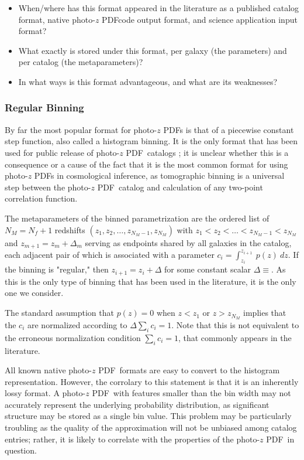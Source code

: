 \documentclass[\docopts]{\docclass}
\newcommand{\pz}{photo-$z$ PDF}
\begin{document}
\begin{itemize}
  \item When/where has this format appeared in the literature as a published 
catalog format, native \pz code output format, and science application input 
format?
  \item What exactly is stored under this format, per galaxy (the parameters) 
and per catalog (the metaparameters)?
  \item In what ways is this format advantageous, and what are its weaknesses?
\end{itemize}

\subsubsection{Regular Binning}
\label{sec:bins}

By far the most popular format for \pz s is that of a piecewise constant step 
function, also called a histogram binning.  It is the only format that has been 
used for public release of \pz\ catalogs \citep{tanaka_photometric_2017, 
sheldon_photometric_2012}; it is unclear whether this is a consequence or a 
cause of the fact that it is the most common format for using \pz s in 
cosmological inference, as tomographic binning is a universal step between the 
\pz\ catalog and calculation of any two-point correlation function.

The metaparameters of the binned parametrization are the ordered list of 
$N_{M}=N_{f}+1$ redshifts $(z_{1}, z_{2}, \dots, z_{N_{M}-1}, z_{N_{M}})$ with 
$z_{1} < z_{2} < \dots < z_{N_{M}-1} < z_{N_{M}}$ and 
$z_{m+1}=z_{m}+\Delta_{m}$ serving as endpoints shared by all galaxies in the 
catalog, each adjacent pair of which is associated with a parameter 
$c_{i}=\int_{z_{i}}^{z_{i+1}}\ p(z)\ dz$.  If the binning is "regular," then 
$z_{i+1}=z_{i}+\Delta$ for some constant scalar $\Delta\equiv$.  As this is the 
only type of binning that has been used in the literature, it is the only one 
we consider.

The standard assumption that $p(z)=0$ when $z<z_{1}$ or $z>z_{N_{M}}$ implies 
that the $c_{i}$ are normalized according to $\Delta \sum_{i} c_{i} = 1$.  Note 
that this is not equivalent to the erroneous normalization condition $\sum_{i} 
c_{i} = 1$, that commonly appears in the literature.

All known native \pz\ formats are easy to convert to the histogram 
representation.  However, the corrolary to this statement is that it is an 
inherently lossy format.  A \pz\ with features smaller than the bin width may 
not accurately represent the underlying probability distribution, as 
significant structure may be stored as a single bin value.  This problem may be 
particularly troubling as the quality of the approximation will not be unbiased 
among catalog entries; rather, it is likely to correlate with the properties of 
the \pz\ in question.
\end{document}
